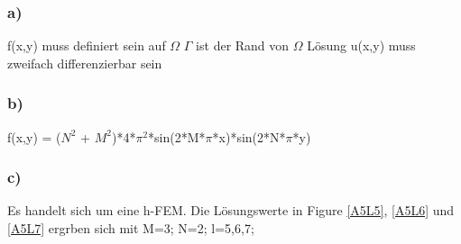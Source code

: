 \documentclass{article}
\begin{document}
	\subsubsection{a)}
	f(x,y) muss definiert sein auf $\Omega$ \newline
	$\Gamma$ ist der Rand von $\Omega$  \newline
	L\"{o}sung u(x,y) muss zweifach differenzierbar sein 
	\subsubsection{b)}
	f(x,y) = ($N^2$ + $M^2$)*4*$\pi^2$*sin(2*M*$\pi$*x)*sin(2*N*$\pi$*y)
	\subsubsection{c)}
	Es handelt sich um eine h-FEM.  \newline
	Die Lösungswerte in Figure \ref{A5L5}, \ref{A5L6} und \ref{A5L7} ergrben sich mit M=3; N=2; l=5,6,7;  \newline
\end{document}
